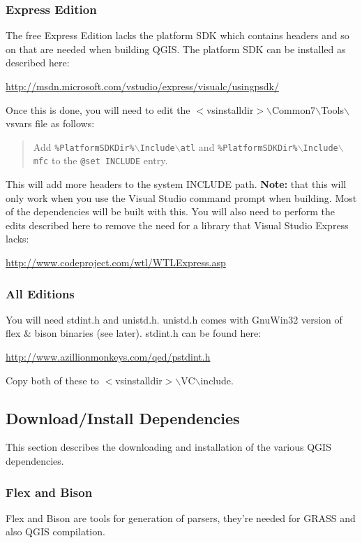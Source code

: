 \subsubsection{Express Edition}
The free Express Edition lacks the platform SDK which contains headers and so on that are needed when building QGIS. The platform SDK can be installed as described here:


\url{http://msdn.microsoft.com/vstudio/express/visualc/usingpsdk/}

Once this is done, you will need to edit the $<$vsinstalldir$>$$\backslash$Common7$\backslash$Tools$\backslash$vsvars file as follows:

	\begin{quotation}
Add \texttt{\%PlatformSDKDir\%$\backslash$Include$\backslash$atl} and \texttt{\%PlatformSDKDir\%$\backslash$Include$\backslash$mfc} to the \texttt{@set INCLUDE} entry.
	\end{quotation}
This will add more headers to the system INCLUDE path. \textbf{Note:} that this will only work when you use the Visual Studio command prompt when building. Most of the dependencies will be built with this.
You will also need to perform the edits described here to remove the need for a library that Visual Studio Express lacks:

\url{http://www.codeproject.com/wtl/WTLExpress.asp}


\subsubsection{All Editions}
You will need stdint.h and unistd.h. unistd.h comes with GnuWin32 version of flex \& bison binaries (see later). stdint.h can be found here:

\url{http://www.azillionmonkeys.com/qed/pstdint.h}

Copy both of these to $<$vsinstalldir$>$$\backslash$VC$\backslash$include.

\subsection{Download/Install Dependencies}
This section describes the downloading and installation of the various QGIS dependencies.

\subsubsection{Flex and Bison}
Flex and Bison are tools for generation of parsers, they're needed for GRASS and also QGIS compilation.

